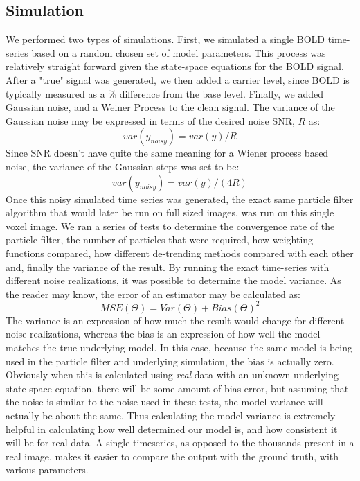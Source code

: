 \documentclass{article}
\begin{document}
\subsection{Simulation}
We performed two types of simulations. First, we simulated a single BOLD time-series based
on a random chosen set of model parameters. This process was relatively straight forward
given the state-space equations for the BOLD signal. After a "true" signal was generated,
we then added a carrier level, since BOLD is typically measured as a \% difference from the
base level. Finally, we added Gaussian noise, and a Weiner Process to the clean signal. The
variance of the Gaussian noise may be expressed in terms of the desired noise SNR, $R$ as:
\begin{equation}
var(y_{noisy}) = var(y) / R
\end{equation}
Since SNR doesn't have quite the same meaning for a Wiener process based noise, the variance 
of the Gaussian steps was set to be:
\begin{equation}
var(y_{noisy}) = var(y) / (4R)
\end{equation}
Once this noisy simulated time series was generated, the exact same particle filter algorithm
that would later be run on full sized images, was run on this single voxel image. We ran
a series of tests to determine the convergence rate of the particle filter, the number
of particles that were required, how weighting functions compared, how different de-trending
methods compared with each other and, finally the variance of the result. By running the exact
time-series with different noise realizations, it was possible to determine the model variance.
As the reader may know, the error of an estimator may be calculated as:
\begin{equation}
MSE(\Theta) = Var(\Theta) + Bias(\Theta)^2
\end{equation}
The variance is an expression of how much the result would change for different noise realizations,
whereas the bias is an expression of how well the model matches the true underlying model. In
this case, because the same model is being used in the particle filter and underlying simulation,
the bias is actually zero. Obviously when this is calculated using \emph{real} data with an unknown
underlying state space equation, there will be some amount of bias error, but assuming that the
noise is similar to the noise used in these tests, the model variance will actually be about the
same. Thus calculating the model variance is extremely helpful in calculating how well determined
our model is, and how consistent it will be for real data. A single timeseries, as opposed to the
thousands present in a real image, makes it easier to 
compare the output with the ground truth, with various parameters. 
\end{document}
